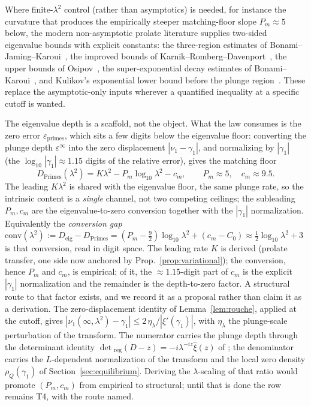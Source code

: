 \documentclass[11pt,a4paper]{article}
\begin{document}
Where finite-$\lambda^2$ control (rather than asymptotics) is needed, for
instance the curvature that produces the empirically steeper matching-floor
slope $P_m\approx5$ below, the modern non-asymptotic prolate literature
supplies two-sided eigenvalue bounds with explicit constants: the
three-region estimates of Bonami--Jaming--Karoui~\cite{BJK2021}, the improved
bounds of Karnik--Romberg--Davenport~\cite{KRD2021}, the upper bounds of
Osipov~\cite{Osipov2013}, the super-exponential decay estimates of
Bonami--Karoui~\cite{BonamiKaroui2017}, and Kulikov's exponential lower bound
before the plunge region~\cite{Kulikov2023}. These replace the
asymptotic-only inputs wherever a quantified inequality at a specific cutoff
is wanted.

The eigenvalue depth is a scaffold, not the object. What the law consumes is the
zero error $\varepsilon_{\mathrm{primes}}$, which sits a few digits below the
eigenvalue floor: converting the plunge depth $\varepsilon^\infty$ into the zero
displacement $|\nu_1-\gamma_1|$, and normalizing by $|\gamma_1|$ (the
$\log_{10}|\gamma_1|\approx1.15$ digits of the relative error), gives the matching
floor
\begin{equation}\label{eq:primes}
  D_{\mathrm{Primes}}(\lambda^2)=K\lambda^2-P_m\log_{10}\lambda^2-c_m,
  \qquad P_m\approx5,\quad c_m\approx9.5.
\end{equation}
The leading $K\lambda^2$ is shared with the eigenvalue floor, the same plunge
rate, so the intrinsic content is a \emph{single} channel, not two competing
ceilings; the subleading $P_m,c_m$ are the eigenvalue-to-zero conversion together
with the $|\gamma_1|$ normalization. Equivalently the \emph{conversion gap}
$\mathrm{conv}(\lambda^2):=D_{\mathrm{eig}}-D_{\mathrm{Primes}}
=(P_m-\tfrac92)\log_{10}\lambda^2+(c_m-C_0)\approx\tfrac12\log_{10}\lambda^2+3$
is that conversion, read in digit space. The leading rate $K$ is derived (prolate
transfer, one side now anchored by Prop.~\ref{prop:variational}); the
conversion, hence $P_m$ and $c_m$, is empirical; of it, the
$\approx1.15$-digit part of $c_m$ is the explicit $|\gamma_1|$ normalization and
the remainder is the depth-to-zero factor. A structural route to that factor exists, and we record it as a proposal
rather than claim it as a derivation. The zero-displacement identity of
Lemma~\ref{lem:rouche}, applied at the cutoff, gives
$|\nu_1(\infty,\lambda^2)-\gamma_1|\le
2\,\eta_\lambda/|\widehat\xi'(\gamma_1)|$, with $\eta_\lambda$ the
plunge-scale perturbation of the transform. The numerator carries the plunge
depth through the determinant identity
$\det{}_{\!\mathrm{reg}}(D-z)=-i\lambda^{-iz}\widehat\xi(z)$ of
\cite[Thm.~5.10]{CCM2025}; the denominator carries the $L$-dependent
normalization of the transform and the local zero density $\rho_Q(\gamma_1)$
of Section~\ref{sec:equilibrium}. Deriving the $\lambda$-scaling of that ratio
would promote $(P_m,c_m)$ from empirical to structural; until that is done the
row remains T4, with the route named.
\end{document}
